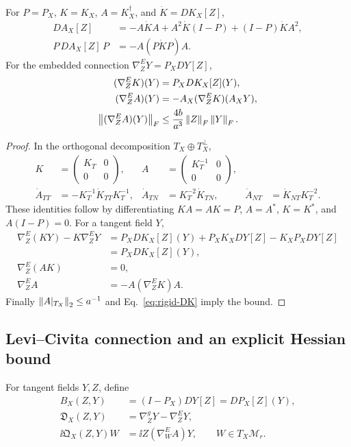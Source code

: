 \begin{proposition}
For $P=P_X$, $K=K_X$, $A=K_X^\dagger$, and $\dot K=DK_X[Z]$,
\begin{align}
DA_X[Z]
&=-A\dot KA+A^2\dot K(I-P)+(I-P)\dot KA^2,\\
P\,DA_X[Z]\,P&=-A(P\dot KP)A .
\label{eq:rigid-pseudoinverse-derivative}
\end{align}
For the embedded connection $\nabla^E_ZY=P_XDY[Z]$,
\begin{align}
(\nabla^E_ZK)(Y)&=P_XDK_X[Z](Y),\\
(\nabla^E_ZA)(Y)&=-A_X(\nabla^E_ZK)(A_XY),\\
\left\lVert(\nabla^E_ZA)(Y)\right\rVert_F
&\leq \frac{4b}{a^3}\left\lVert Z\right\rVert_F\left\lVert Y\right\rVert_F .
\label{eq:rigid-bundle-derivative}
\end{align}
\end{proposition}
\begin{proof}
In the orthogonal decomposition $T_X\oplus T_X^\perp$,
\begin{align}
K&=\begin{pmatrix}K_T&0\\0&0\end{pmatrix},&
A&=\begin{pmatrix}K_T^{-1}&0\\0&0\end{pmatrix},\\
\dot A_{TT}&=-K_T^{-1}\dot K_{TT}K_T^{-1},&
\dot A_{TN}&=K_T^{-2}\dot K_{TN},&
\dot A_{NT}&=\dot K_{NT}K_T^{-2}.
\end{align}
These identities follow by differentiating $KA=AK=P$, $A=A^*$,
$K=K^*$, and $A(I-P)=0$. For a tangent field $Y$,
\begin{align}
\nabla^E_Z(KY)-K\nabla^E_ZY
&=P_XDK_X[Z](Y)+P_XK_XDY[Z]-K_XP_XDY[Z]\\
&=P_XDK_X[Z](Y),\\
\nabla^E_Z(AK)&=0,\\
\nabla^E_ZA&=-A(\nabla^E_ZK)A .
\end{align}
Finally $\left\lVert A|_{T_X}\right\rVert_2\leq a^{-1}$ and
Eq.~\eqref{eq:rigid-DK} imply the bound.
\end{proof}

\subsection{Levi--Civita connection and an explicit Hessian bound}
\begin{definition}
For tangent fields $Y,Z$, define
\begin{align}
B_X(Z,Y)&=(I-P_X)DY[Z]=DP_X[Z](Y),\\
\mathfrak D_X(Z,Y)
&=\nabla^g_ZY-\nabla^E_ZY,\\
\ii{\mathfrak Q_X(Z,Y)}W
&=\ii Z{(\nabla^E_WA)Y},\qquad W\in T_X\mathcal M_r .
\end{align}
\end{definition}

